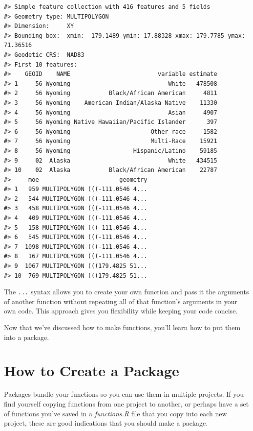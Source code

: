 \documentclass[
]{book}
\begin{document}
\begin{verbatim}
#> Simple feature collection with 416 features and 5 fields
#> Geometry type: MULTIPOLYGON
#> Dimension:     XY
#> Bounding box:  xmin: -179.1489 ymin: 17.88328 xmax: 179.7785 ymax: 71.36516
#> Geodetic CRS:  NAD83
#> First 10 features:
#>    GEOID    NAME                         variable estimate
#> 1     56 Wyoming                            White   478508
#> 2     56 Wyoming           Black/African American     4811
#> 3     56 Wyoming    American Indian/Alaska Native    11330
#> 4     56 Wyoming                            Asian     4907
#> 5     56 Wyoming Native Hawaiian/Pacific Islander      397
#> 6     56 Wyoming                       Other race     1582
#> 7     56 Wyoming                       Multi-Race    15921
#> 8     56 Wyoming                  Hispanic/Latino    59185
#> 9     02  Alaska                            White   434515
#> 10    02  Alaska           Black/African American    22787
#>     moe                       geometry
#> 1   959 MULTIPOLYGON (((-111.0546 4...
#> 2   544 MULTIPOLYGON (((-111.0546 4...
#> 3   458 MULTIPOLYGON (((-111.0546 4...
#> 4   409 MULTIPOLYGON (((-111.0546 4...
#> 5   158 MULTIPOLYGON (((-111.0546 4...
#> 6   545 MULTIPOLYGON (((-111.0546 4...
#> 7  1098 MULTIPOLYGON (((-111.0546 4...
#> 8   167 MULTIPOLYGON (((-111.0546 4...
#> 9  1067 MULTIPOLYGON (((179.4825 51...
#> 10  769 MULTIPOLYGON (((179.4825 51...
\end{verbatim}

The \texttt{...} syntax allows you to create your own function and pass it the arguments of another function without repeating all of that function's arguments in your own code. This approach gives you flexibility while keeping your code concise.

Now that we've discussed how to make functions, you'll learn how to put them into a package.

\hypertarget{how-to-create-a-package}{%
\section*{How to Create a Package}\label{how-to-create-a-package}}

Packages bundle your functions so you can use them in multiple projects. If you find yourself copying functions from one project to another, or perhaps have a set of functions you've saved in a \emph{functions.R} file that you copy into each new project, these are good indications that you should make a package.
\end{document}
